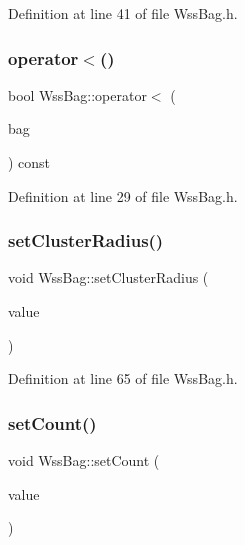Definition at line 41 of file Wss\+Bag.\+h.

\mbox{\label{class_wss_bag_af78f05046f501370d2f9fdd357229d5d}} 
\subsubsection{\texorpdfstring{operator$<$()}{operator<()}}
{\footnotesize\ttfamily bool Wss\+Bag\+::operator$<$ (\begin{DoxyParamCaption}\item[{const \hyperlink{class_wss_bag}{Wss\+Bag} \&}]{bag }\end{DoxyParamCaption}) const\hspace{0.3cm}{\ttfamily [inline]}}



Definition at line 29 of file Wss\+Bag.\+h.

\mbox{\label{class_wss_bag_af79ca518bffb8df641655b70707c3f1a}} 
\subsubsection{\texorpdfstring{set\+Cluster\+Radius()}{setClusterRadius()}}
{\footnotesize\ttfamily void Wss\+Bag\+::set\+Cluster\+Radius (\begin{DoxyParamCaption}\item[{const float \&}]{value }\end{DoxyParamCaption})\hspace{0.3cm}{\ttfamily [inline]}}



Definition at line 65 of file Wss\+Bag.\+h.

\mbox{\label{class_wss_bag_a4467a111c05bfced71e799414fa6144c}} 
\subsubsection{\texorpdfstring{set\+Count()}{setCount()}}
{\footnotesize\ttfamily void Wss\+Bag\+::set\+Count (\begin{DoxyParamCaption}\item[{const int \&}]{value }\end{DoxyParamCaption})\hspace{0.3cm}{\ttfamily [inline]}}



